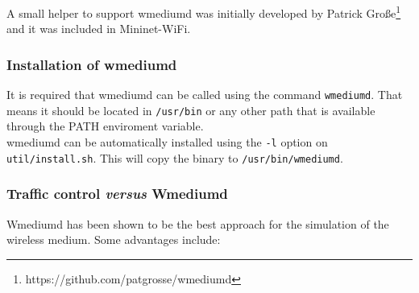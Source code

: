 A small helper to support wmediumd was initially developed by Patrick Große\footnote{https://github.com/patgrosse/wmediumd} and it was included in Mininet-WiFi. %




\subsubsection{Installation of wmediumd}
It is required that wmediumd can be called using the command \texttt{wmediumd}. That means it should be located in \texttt{/usr/bin} or any other path that is available through the PATH enviroment variable.\\
wmediumd can be automatically installed using the \texttt{-l} option on \texttt{util/install.sh}. This will copy the binary to \texttt{/usr/bin/wmediumd}.


\subsubsection{Traffic control \textit{versus} Wmediumd}
Wmediumd has been shown to be the best approach for the simulation of the wireless medium. Some advantages include:


